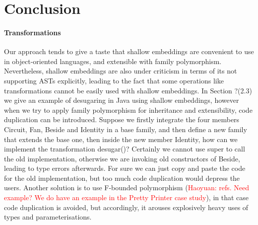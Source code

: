 \section{Conclusion}\label{sec:conclusion}









\paragraph{Transformations} Our approach tends to give a taste that shallow embeddings are convenient to
use in object-oriented languages, and extensible with family polymorphism. Nevertheless, shallow embeddings are also under
criticism in terms of its not supporting ASTs explicitly, leading to the fact that some operations like transformations
cannot be easily used with shallow embeddings. In Section ?(2.3) we give an example of desugaring in Java using shallow
embeddings, however when we try to apply family polymorphism for inheritance and extensibility, code duplication can be introduced.
Suppose we firstly integrate the four members \textsf{Circuit}, \textsf{Fan}, \textsf{Beside} and \textsf{Identity} in a base family,
and then define a new family that extends the base one, then inside the new member \textsf{Identity}, how can we implement the transformation \textsf{desugar()}? Certainly we cannot use \textsf{super} to call the old implementation, otherwise we are invoking old constructors of \textsf{Beside},
leading to type errors afterwards. For sure we can just copy and paste the code for the old implementation, but too much
code duplication would depress the users. Another solution is to use F-bounded polymorphism (\textcolor{red}{Haoyuan: refs. Need example?
We do have an example in the Pretty Printer case study}),
in that case code duplication is avoided, but accordingly, it arouses explosively heavy uses of types and parameterisations.

